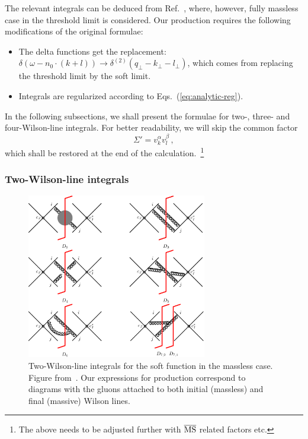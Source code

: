 \documentclass[a4paper,11pt]{report}
\numberwithin{equation}{section}
\begin{document}
The relevant integrals can be deduced from Ref.~\cite{Ferroglia:2012uy}, where,
however, fully massless case in the threshold limit is considered. Our \ttbar
production requires the following modifications of the original formulae:
%
\begin{itemize}
  \item
  The delta functions get the replacement:
  $\delta(\omega - n_0 \cdot (k+l)) \to \delta^{(2)}(q_\perp-k_\perp-l_\perp)$,
  which comes from replacing the threshold limit by the soft limit.
  \item
  Integrals are regularized according to Eqs.~(\ref{eq:analytic-reg}).
\end{itemize}

In the following subsections, we shall present the formulae for two-, three- and
four-Wilson-line integrals. For better readability, we will skip the common
factor
%
\begin{equation}
  \Sigma' = v_k^\alpha v_l^\beta\,,
\end{equation}
%
which shall be restored at the end of the calculation.~\footnote{The above needs
to be adjusted further with $\overline{\text{MS}}$ related factors etc.}

\subsubsection{Two-Wilson-line integrals}

\begin{figure}[t]
  \begin{center}
    \includegraphics[width=0.7\textwidth]{plots/diagram2-pecjak.png}
  \end{center}
  \caption{Two-Wilson-line integrals for the soft function in the massless case.
  Figure from~\cite{Ferroglia:2012uy}. Our expressions for \ttbar production
  correspond to diagrams with the gluons attached to both initial
  (massless) and final (massive) Wilson lines.}
  \label{fig:pecjak2}
\end{figure}
\end{document}
